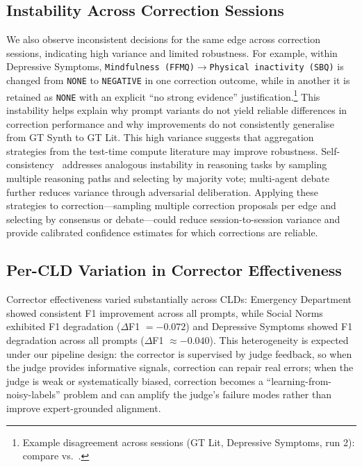 \subsection{Instability Across Correction Sessions}
We also observe inconsistent decisions for the same edge across correction sessions, indicating high variance and limited robustness. For example, within Depressive Symptoms, \texttt{Mindfulness (FFMQ)}$\rightarrow$\texttt{Physical inactivity (SBQ)} is changed from \texttt{NONE} to \texttt{NEGATIVE} in one correction outcome, while in another it is retained as \texttt{NONE} with an explicit ``no strong evidence'' justification.\footnote{Example disagreement across sessions (GT Lit, Depressive Symptoms, run 2): compare  vs.\ .}%
This instability helps explain why prompt variants do not yield reliable differences in correction performance and why improvements do not consistently generalise from GT Synth to GT Lit. This high variance suggests that aggregation strategies from the test-time compute literature may improve robustness. Self-consistency~\citep{wang2023selfconsistency} addresses analogous instability in reasoning tasks by sampling multiple reasoning paths and selecting by majority vote; multi-agent debate~\citep{du2023multiagentdebate} further reduces variance through adversarial deliberation. Applying these strategies to correction---sampling multiple correction proposals per edge and selecting by consensus or debate---could reduce session-to-session variance and provide calibrated confidence estimates for which corrections are reliable.

\subsection{Per-CLD Variation in Corrector Effectiveness}

Corrector effectiveness varied substantially across CLDs: Emergency Department showed consistent F1 improvement across all prompts, while Social Norms exhibited F1 degradation ($\Delta$F1 $= -0.072$) and Depressive Symptoms showed F1 degradation across all prompts ($\Delta$F1 $\approx -0.040$). This heterogeneity is expected under our pipeline design: the corrector is supervised by judge feedback, so when the judge provides informative signals, correction can repair real errors; when the judge is weak or systematically biased, correction becomes a ``learning-from-noisy-labels'' problem and can amplify the judge's failure modes rather than improve expert-grounded alignment.

